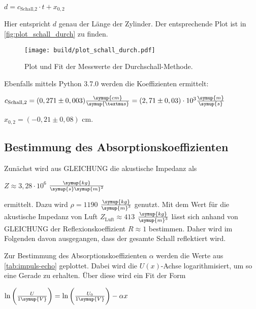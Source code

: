 \begin{center}
    $d = c_\text{Schall,2} \cdot t + x_{0,2}$
\end{center}

Hier entspricht $d$ genau der Länge der Zylinder. Der entsprechende Plot ist in \autoref{fig:plot_schall_durch} zu finden.

\begin{figure}
    \centering
    \texttt{[image: build/plot\_schall\_durch.pdf]}
    \caption{Plot und Fit der Messwerte der Durchschall-Methode.}
    \label{fig:plot_schall_durch}
\end{figure}

Ebenfalls mittels Python 3.7.0 werden die Koeffizienten ermittelt:

\begin{center}
    $c_\text{Schall,2} = (0,271 \pm 0,003) \frac{\symup{cm}}{\symup{µs}} = (2,71 \pm 0,03) \cdot 10^{3} \frac{\symup{m}}{\symup{s}}$
    
    $x_{0,2} = (-0,21 \pm 0,08)$ cm.
\end{center}


\subsection{Bestimmung des Absorptionskoeffizienten}

Zunächst wird aus GLEICHUNG die akustische Impedanz als

\begin{center}
    $Z \approx 3,28 \cdot 10^{6}$ $\frac{\symup{kg}}{\symup{s}\symup{m}^2}$
\end{center}

ermittelt. Dazu wird $\rho = 1190$ $\frac{\symup{kg}}{\symup{m}^3}$ \cite{pmma} genutzt. 
Mit dem Wert für die akustische Impedanz von Luft $Z_\text{Luft} \approx 413$ $\frac{\symup{kg}}{\symup{m}^3}$\cite{akImLuft} lässt sich anhand von GLEICHUNG der Reflexionskoeffizient $R \approx 1$ bestimmen.
Daher wird im Folgenden davon ausgegangen, dass der gesamte Schall reflektiert wird.

Zur Bestimmung des Absorptionskoeffizienten $\alpha$ werden die Werte aus \autoref{tab:impuls-echo} geplottet.
Dabei wird die $U(x)$-Achse logarithmisiert, um so eine Gerade zu erhalten.
Über diese wird ein Fit der Form

\begin{center}
    $\ln \bigg( \frac{U}{1 \symup{V}} \bigg) = \ln \bigg( \frac{U_0}{1 \symup{V}} \bigg) - \alpha x$
\end{center}

